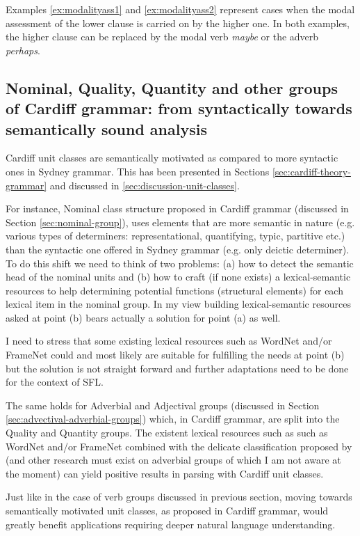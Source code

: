 Examples \ref{ex:modalityass1} and \ref{ex:modalityass2} represent cases when the modal assessment of the lower clause is carried on by the higher one. In both examples, the higher clause can be replaced by the modal verb \textit{maybe} or the adverb \textit{perhaps}. 

\subsection{Nominal, Quality, Quantity and other groups of Cardiff grammar: from syntactically towards semantically sound analysis}
Cardiff unit classes are semantically motivated as compared to more syntactic ones in Sydney grammar. This has been presented in Sections \ref{sec:cardiff-theory-grammar} and discussed in \ref{sec:discussion-unit-classes}.

For instance, Nominal class structure proposed in Cardiff grammar (discussed in Section \ref{sec:nominal-group}), uses elements that are more semantic in nature (e.g. various types of determiners: representational, quantifying, typic, partitive etc.) than the syntactic one offered in Sydney grammar (e.g. only deictic determiner). To do this shift we need to think of two problems: (a) how to detect the semantic head of the nominal units and (b) how to craft (if none exists) a lexical-semantic resources to help determining potential functions (structural elements) for each lexical item in the nominal group. In my view building lexical-semantic resources asked at point (b) bears actually a solution for point (a) as well.

I need to stress that some existing lexical resources such as WordNet \citep{Miller1995} and/or FrameNet\citep{Baker1998} could and most likely are suitable for fulfilling the needs at point (b) but the solution is not straight forward and further adaptations need to be done for the context of SFL.

The same holds for Adverbial and Adjectival groups (discussed in Section \ref{sec:advectival-adverbial-groups}) which, in Cardiff grammar, are split into the Quality and Quantity groups. The existent lexical resources such as such as WordNet \citep{Miller1995} and/or FrameNet\citep{Baker1998} combined with the delicate classification proposed by \citet{Tucker1997} (and other research must exist on adverbial groups of which I am not aware at the moment) can yield positive results in parsing with Cardiff unit classes. 

Just like in the case of verb groups discussed in previous section, moving towards semantically motivated unit classes, as proposed in Cardiff grammar, would greatly benefit applications requiring deeper natural language understanding.

